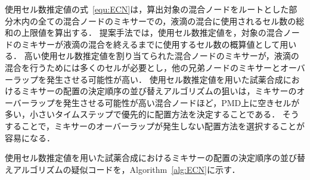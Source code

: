 使用セル数推定値の式~\eqref{equ:ECN}は，算出対象の混合ノードをルートとした部分木内の全ての混合ノードのミキサーでの，液滴の混合に使用されるセル数の総和の上限値を算出する．
提案手法では，使用セル数推定値を，対象の混合ノードのミキサーが液滴の混合を終えるまでに使用するセル数の概算値として用いる．
高い使用セル数推定値を割り当てられた混合ノードのミキサーが，液滴の混合を行うためには多くのセルが必要とし，他の兄弟ノードのミキサーとオーバーラップを発生させる可能性が高い．
使用セル数推定値を用いた試薬合成におけるミキサーの配置の決定順序の並び替えアルゴリズムの狙いは，ミキサーのオーバーラップを発生させる可能性が高い混合ノードほど，PMD上に空きセルが多い，小さいタイムステップで優先的に配置方法を決定することである．
そうすることで，ミキサーのオーバーラップが発生しない配置方法を選択することが容易になる．

使用セル数推定値を用いた試薬合成におけるミキサーの配置の決定順序の並び替えアルゴリズムの疑似コードを，Algorithm~\ref{alg:ECN}に示す．

